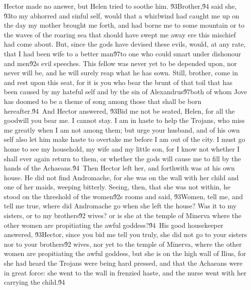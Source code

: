 {Hector made no answer, but Helen tried to soothe him. \'93Brother,\'94 said she, \'93to my abhorred and sinful self, would that a whirlwind had caught me up on the day my mother brought me forth, and had borne me to some mountain or to the waves of the roaring sea that should have swept me away ere this mischief had come about. But, since the gods have devised these evils, would, at any rate, that I had been wife to a better man\'97to one who could smart under dishonour and men\'92s evil speeches. This fellow was never yet to be depended upon, nor never will be, and he will surely reap what he has sown. Still, brother, come in and rest upon this seat, for it is you who bear the brunt of that toil that has been caused by my hateful self and by the sin of Alexandrus\'97both of whom Jove has doomed to be a theme of song among those that shall be born hereafter.\'94\
And Hector answered, \'93Bid me not be seated, Helen, for all the goodwill you bear me. I cannot stay. I am in haste to help the Trojans, who miss me greatly when I am not among them; but urge your husband, and of his own self also let him make haste to overtake me before I am out of the city. I must go home to see my household, my wife and my little son, for I know not whether I shall ever again return to them, or whether the gods will cause me to fill by the hands of the Achaeans.\'94\
Then Hector left her, and forthwith was at his own house. He did not find Andromache, for she was on the wall with her child and one of her maids, weeping bitterly. Seeing, then, that she was not within, he stood on the threshold of the women\'92s rooms and said, \'93Women, tell me, and tell me true, where did Andromache go when she left the house? Was it to my sisters, or to my brothers\'92 wives? or is she at the temple of Minerva where the other women are propitiating the awful goddess?\'94\
His good housekeeper answered, \'93Hector, since you bid me tell you truly, she did not go to your sisters nor to your brothers\'92 wives, nor yet to the temple of Minerva, where the other women are propitiating the awful goddess, but she is on the high wall of Ilius, for she had heard the Trojans were being hard pressed, and that the Achaeans were in great force: she went to the wall in frenzied haste, and the nurse went with her carrying the child.\'94\
}

